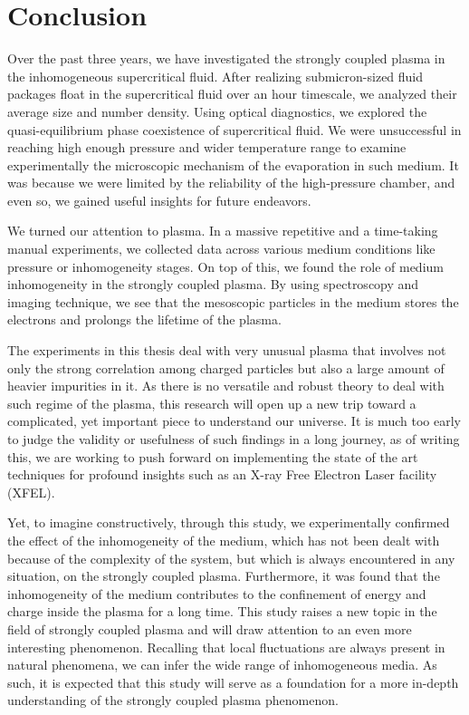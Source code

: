 
\chapter{Conclusion}
\label{sec:ch5}

Over the past three years, we have investigated the strongly coupled plasma in the inhomogeneous supercritical fluid. After realizing submicron-sized fluid packages float in the supercritical fluid over an hour timescale, we analyzed their average size and number density. Using optical diagnostics, we explored the quasi-equilibrium phase coexistence of supercritical fluid. We were unsuccessful in reaching high enough pressure and wider temperature range to examine experimentally the microscopic mechanism of the evaporation in such medium. It was because we were limited by the reliability of the high-pressure chamber, and even so, we gained useful insights for future endeavors.

We turned our attention to plasma. In a massive repetitive and a time-taking manual experiments, we collected data across various medium conditions like pressure or inhomogeneity stages. On top of this, we found the role of medium inhomogeneity in the strongly coupled plasma. By using spectroscopy and imaging technique, we see that the mesoscopic particles in the medium stores the electrons and prolongs the lifetime of the plasma.

The experiments in this thesis deal with very unusual plasma that involves not only the strong correlation among charged particles but also a large amount of heavier impurities in it. As there is no versatile and robust theory to deal with such regime of the plasma, this research will open up a new trip toward a complicated, yet important piece to understand our universe. It is much too early to judge the validity or usefulness of such findings in a long journey, as of writing this, we are working to push forward on implementing the state of the art techniques for profound insights such as an X-ray Free Electron Laser facility (XFEL).

Yet, to imagine constructively, through this study, we experimentally confirmed the effect of the inhomogeneity of the medium, which has not been dealt with because of the complexity of the system, but which is always encountered in any situation, on the strongly coupled plasma. Furthermore, it was found that the inhomogeneity of the medium contributes to the confinement of energy and charge inside the plasma for a long time. This study raises a new topic in the field of strongly coupled plasma and will draw attention to an even more interesting phenomenon. Recalling that local fluctuations are always present in natural phenomena, we can infer the wide range of inhomogeneous media. As such, it is expected that this study will serve as a foundation for a more in-depth understanding of the strongly coupled plasma phenomenon.

